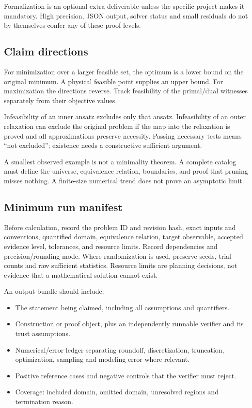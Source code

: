 \documentclass[
  11pt,
]{article}
\providecommand{\tightlist}{%
  \setlength{\itemsep}{0pt}\setlength{\parskip}{0pt}}
\begin{document}
Formalization is an optional extra deliverable unless the specific
project makes it mandatory. High precision, JSON output, solver status
and small residuals do not by themselves confer any of these proof
levels.

\subsection{Claim directions}

For minimization over a larger feasible set, the optimum is a lower
bound on the original minimum. A physical feasible point supplies an
upper bound. For maximization the directions reverse. Track feasibility
of the primal/dual witnesses separately from their objective values.

Infeasibility of an inner ansatz excludes only that ansatz.
Infeasibility of an outer relaxation can exclude the original problem if
the map into the relaxation is proved and all approximations preserve
necessity. Passing necessary tests means ``not excluded''; existence
needs a constructive sufficient argument.

A smallest observed example is not a minimality theorem. A complete
catalog must define the universe, equivalence relation, boundaries, and
proof that pruning misses nothing. A finite-size numerical trend does
not prove an asymptotic limit.

\subsection{Minimum run manifest}

Before calculation, record the problem ID and revision hash, exact
inputs and conventions, quantified domain, equivalence relation, target
observable, accepted evidence level, tolerances, and resource limits.
Record dependencies and precision/rounding mode. Where randomization is
used, preserve seeds, trial counts and raw sufficient statistics.
Resource limits are planning decisions, not evidence that a mathematical
solution cannot exist.

An output bundle should include:

\begin{itemize}
\tightlist
\item
  The statement being claimed, including all assumptions and
  quantifiers.
\item
  Construction or proof object, plus an independently runnable verifier
  and its trust assumptions.
\item
  Numerical/error ledger separating roundoff, discretization,
  truncation, optimization, sampling and modeling error where relevant.
\item
  Positive reference cases and negative controls that the verifier must
  reject.
\item
  Coverage: included domain, omitted domain, unresolved regions and
  termination reason.
\end{itemize}
\end{document}
